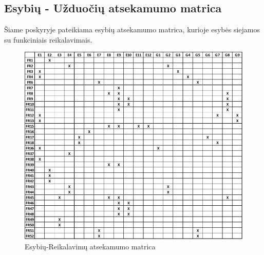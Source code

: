 \documentclass{VUMIFPSbakalaurinis}
\begin{document}
\subsection{Esybių - Užduočių atsekamumo matrica}
Šiame poskyryje pateikiama esybių atsekamumo matrica, kurioje esybės siejamos su funkciniais reikalavimais.
\begin{figure}[H]
    \centering
    \includegraphics[scale=0.8]{img/Entity-matrix}
    \caption{Esybių-Reikalavimų atsekamumo matrica}
    \label{img:entity-matrix}
\end{figure}
\end{document}
